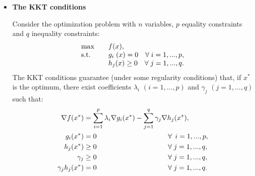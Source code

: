 \documentclass[a4paper,notitlepage,12pt]{article}
\begin{document}
\begin{itemize}[leftmargin=*]
\renewcommand{\labelitemi}{$\bullet$}

	\item \textbf{The KKT conditions}
	\vspace{.3cm}
	
	Consider the optimization problem with $n$ variables, $p$ equality constraints and $q$ inequality constraints:
	\begin{equation*}
		\begin{array}{lll}
			\max && f(x), \\ 
			\mbox{s.t.} && g_i \hspace{.1cm} (x) = 0 \quad \forall \; i = 1, ..., p, \\
			&& h_j(x) \geq 0 \quad \forall \; j = 1, ..., q.
		\end{array}
	\end{equation*}
	The KKT conditions guarantee (under some regularity conditions) that, if $x^*$ is the optimum, there exist coefficients $\lambda_i$ $(i = 1, ..., p)$ and $\gamma_j$ $(j = 1, ..., q)$ such that:
	\begin{align*}
		\nabla f(x^*) & = \sum_{i = 1}^p \lambda_i \nabla g_i(x^*) - \sum_{j = 1}^q \gamma_j \nabla h_j(x^*), \\
		g_i(x^*) & = 0 \hspace{3.58cm} \forall \hspace{.07cm} \; i = 1, ..., p, \\
		h_j(x^*) & \geq 0 \hspace{3.58cm} \forall \; j = 1, ..., q, \\
		\gamma_j & \geq 0 \hspace{3.58cm} \forall \; j = 1, ..., q, \\
		\gamma_j h_j(x^*) & = 0 \hspace{3.58cm} \forall \; j = 1, ..., q.
	\end{align*}
		
\end{itemize}
\end{document}
